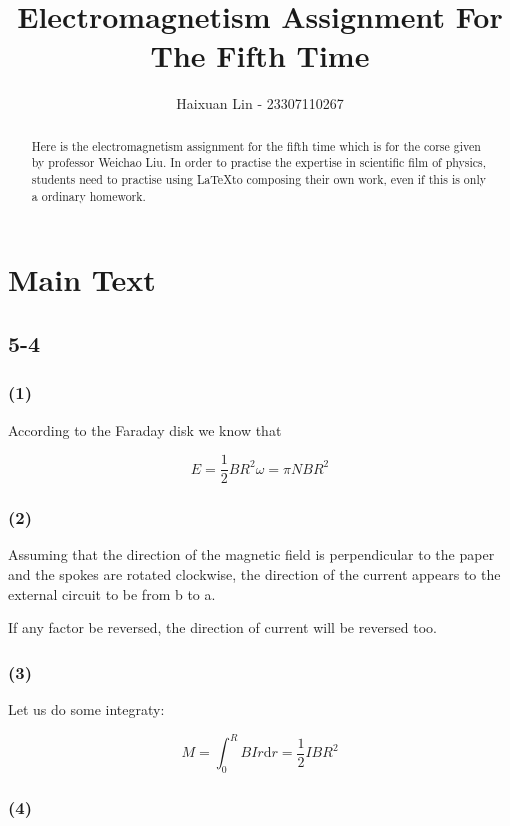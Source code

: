 \documentclass[a4paper,11pt]{amsart}
\title{Electromagnetism Assignment For The Fifth Time}
\author{Haixuan Lin - 23307110267}
\theoremstyle{definition}
\begin{document}
	
	\begin{abstract}
		Here is the electromagnetism assignment for the fifth time which is for the corse given by professor Weichao Liu. In order to practise the expertise in scientific film of physics, students need to practise using \LaTeX to composing their own work, even if this is only a ordinary homework.
	\end{abstract}
	
	\maketitle
	
	\section*{Main Text}
	
	\subsection*{5-4}
	
	\subsubsection*{(1)}
	
	According to the Faraday disk we know that
	
	$$
	E=\dfrac{1}{2}BR^2\omega=\pi NBR^2	
	$$
	
	
	\subsubsection*{(2)}
	
	Assuming that the direction of the magnetic field is perpendicular to the paper and the spokes are rotated clockwise, the direction of the current appears to the external circuit to be from b to a.
	
	If any factor be reversed, the direction of current will be reversed too.
		
	\subsubsection*{(3)}
	
	Let us do some integraty:
	
	$$
	M=\int_0^R{BIr\mathrm{d}r=\frac{1}{2}IBR^2}
	$$
	
	\subsubsection*{(4)}
	
\end{document}
